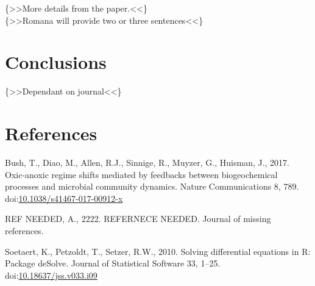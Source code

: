 \documentclass[]{elsarticle} %
\newlength{\cslhangindent}
\newlength{\cslentryspacingunit} %
\newenvironment{CSLReferences}[2] %
 {%
  \setlength{\parindent}{0pt}
  \ifodd #1
  \let\oldpar\par
  \def\par{\hangindent=\cslhangindent\oldpar}
  \fi
  \setlength{\parskip}{#2\cslentryspacingunit}
 }%
 {}
\begin{document}
{\{\textgreater\textgreater More details from the
paper.\textless\textless\}\\
\{\textgreater\textgreater Romana will provide two or three
sentences\textless\textless\}}

\hypertarget{conclusions-1}{%
\section{Conclusions}\label{conclusions-1}}

\{\textgreater\textgreater Dependant on journal\textless\textless\}

\hypertarget{references}{%
\section*{References}\label{references}}

\hypertarget{refs}{}
\begin{CSLReferences}{1}{0}
\leavevmode{}%
Bush, T., Diao, M., Allen, R.J., Sinnige, R., Muyzer, G., Huisman, J.,
2017. Oxic-anoxic regime shifts mediated by feedbacks between
biogeochemical processes and microbial community dynamics. Nature
Communications 8, 789.
doi:\href{https://doi.org/10.1038/s41467-017-00912-x}{10.1038/s41467-017-00912-x}

\leavevmode{}%
REF NEEDED, A., 2222. {REFERNECE NEEDED}. Journal of missing references.

\leavevmode{}%
Soetaert, K., Petzoldt, T., Setzer, R.W., 2010. Solving differential
equations in {R}: {Package deSolve}. Journal of Statistical Software 33,
1--25.
doi:\href{https://doi.org/10.18637/jss.v033.i09}{10.18637/jss.v033.i09}

\end{CSLReferences}
\end{document}
